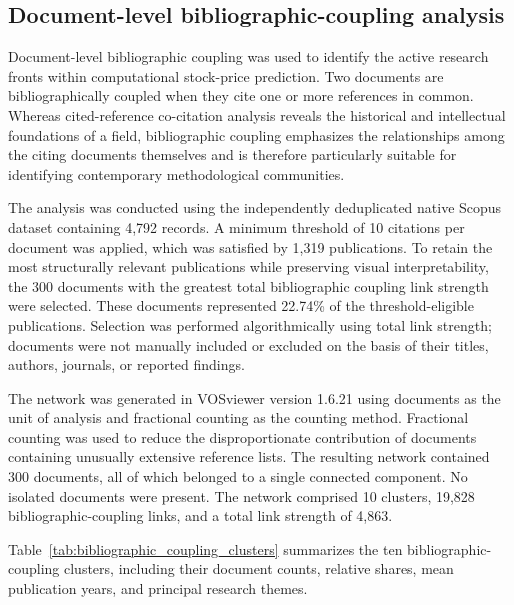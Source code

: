 \documentclass[pdflatex,sn-mathphys-num]{sn-jnl}%
\theoremstyle{thmstyleone}%
\theoremstyle{thmstyletwo}%
\theoremstyle{thmstylethree}%
\begin{document}
\subsection{Document-level bibliographic-coupling analysis}
\label{subsec:document-bibliographic-coupling}
Document-level bibliographic coupling was used to identify the active
research fronts within computational stock-price prediction. Two documents
are bibliographically coupled when they cite one or more references in
common. Whereas cited-reference co-citation analysis reveals the historical
and intellectual foundations of a field, bibliographic coupling emphasizes
the relationships among the citing documents themselves and is therefore
particularly suitable for identifying contemporary methodological
communities.

The analysis was conducted using the independently deduplicated native
Scopus dataset containing 4,792 records. A minimum threshold of 10 citations
per document was applied, which was satisfied by 1,319 publications. To
retain the most structurally relevant publications while preserving visual
interpretability, the 300 documents with the greatest total bibliographic
coupling link strength were selected. These documents represented 22.74\%
of the threshold-eligible publications. Selection was performed
algorithmically using total link strength; documents were not manually
included or excluded on the basis of their titles, authors, journals, or
reported findings.

The network was generated in VOSviewer version 1.6.21 using documents as
the unit of analysis and fractional counting as the counting method.
Fractional counting was used to reduce the disproportionate contribution of
documents containing unusually extensive reference lists. The resulting
network contained 300 documents, all of which belonged to a single connected
component. No isolated documents were present. The network comprised 10
clusters, 19,828 bibliographic-coupling links, and a total link strength of
4,863.

Table~\ref{tab:bibliographic_coupling_clusters} summarizes the ten
bibliographic-coupling clusters, including their document counts,
relative shares, mean publication years, and principal research
themes.
\end{document}
